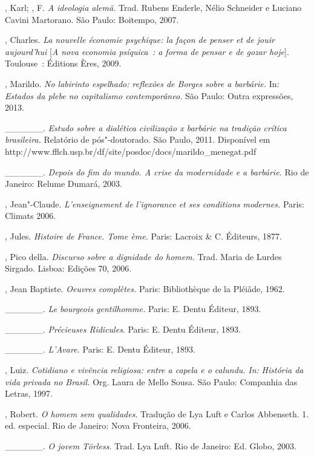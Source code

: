 {\begin{Parskip}
, Karl; , F. \emph{A ideologia alemã.} Trad. Rubens Enderle,
Nélio Schneider e Luciano Cavini Martorano. São Paulo: Boitempo, 2007.

, Charles. \emph{La nouvelle économie psychique: la façon de
penser et de jouir aujourd'hui} [\emph{A nova economia psíquica~: a
forma de pensar e de gozar hoje}]. Toulouse~: Éditions Ères, 2009.

, Marildo. \emph{No labirinto espelhado: reflexões de Borges
sobre a barbárie.} In: \emph{Estados da plebe no capitalismo
contemporâneo.} São Paulo: Outra expressões, 2013.

\_\_\_\_\_\_. \emph{Estudo sobre a dialética civilização x barbárie na
tradição crítica brasileira.} Relatório de pós"-doutorado. São Paulo,
2011. Disponível em
http://www.fflch.usp.br/df/site/posdoc/docs/marildo\_menegat.pdf

\_\_\_\_\_\_. \emph{Depois do fim do mundo. A crise da modernidade e a
barbárie.} Rio de Janeiro: Relume Dumará, 2003.

, Jean"-Claude. \emph{L'enseignement de l'ignorance et ses
conditions modernes.} Paris: Climats 2006.

, Jules. \emph{Histoire de France. Tome ème.} Paris: Lacroix
\& C. Éditeurs, 1877.

, Pico della. \emph{Discurso sobre a dignidade do homem.}
Trad. Maria de Lurdes Sirgado. Lisboa: Edições 70, 2006.

, Jean Baptiste. \emph{Oeuvres complètes.} Paris: Bibliothèque
de la Pléiâde, 1962.

\_\_\_\_\_\_. \emph{Le bourgeois gentilhomme.} Paris: E. Dentu
Éditeur, 1893.

\_\_\_\_\_\_. \emph{Précieuses Ridicules}. Paris: E. Dentu Éditeur,
1893.

\_\_\_\_\_\_. \emph{L'Avare.} Paris: E. Dentu Éditeur, 1893.

, Luiz. \emph{Cotidiano e vivência religiosa: entre a capela e o
calundu.} \emph{In:} \emph{História da vida privada no Brasil.} Org.
Laura de Mello Sousa. São Paulo: Companhia das Letras, 1997.

, Robert. \emph{O homem sem qualidades}. Tradução de Lya Luft e
Carlos Abbenseth. 1. ed. especial. Rio de Janeiro: Nova Fronteira, 2006.

\_\_\_\_\_\_. \emph{O jovem Törless}. Trad. Lya Luft. Rio de Janeiro:
Ed. Globo, 2003.


\end{Parskip}}
